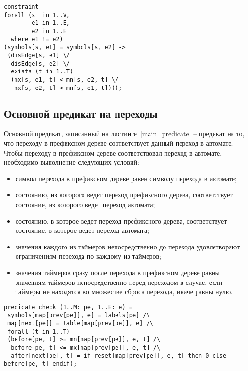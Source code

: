 \documentclass[times,specification,annotation]{itmo-student-thesis}
\begin{document}
\begin{lstlisting}[float=!h,language=Mzn,caption={Ограничение, запрещающее недетерминизм},label={nondeterminism}]
constraint
forall (s  in 1..V,
        e1 in 1..E,
        e2 in 1..E
  where e1 != e2)
(symbols[s, e1] = symbols[s, e2] -> 
 (disEdge[s, e1] \/
  disEdge[s, e2] \/
  exists (t in 1..T) 
  (mx[s, e1, t] < mn[s, e2, t] \/ 
   mx[s, e2, t] < mn[s, e1, t])));
\end{lstlisting}

\subsection{Основной предикат на переходы}

Основной предикат, записанный на листинге~\ref{main_predicate} -- предикат на то, что переходу в префиксном дереве соответствует данный переход в автомате.
Чтобы переходу в префиксном дереве соответствовал переход в автомате, необходимо выполнение следующих условий:

\begin{itemize}
  \item символ перехода в префиксном дереве равен символу перехода в автомате;
  \item состоянию, из которого ведет переход префиксного дерева, соответствует состояние, из которого ведет переход автомата;
  \item состоянию, в которое ведет переход префиксного дерева, соответствует состояние, в которое ведет переход автомата;
  \item значения каждого из таймеров непосредственно до перехода удовлетворяют ограничениям перехода по каждому из таймеров;
  \item значения таймеров сразу после перехода в префиксном дереве равны значениям таймеров непосредственно перед переходом в случае,
    если таймеры не находятся во множестве сброса перехода, иначе равны нулю.
\end{itemize}

\begin{lstlisting}[float=!h,language=Mzn,caption={Основной предикат на переходы},label={main_predicate}]
predicate check (1..M: pe, 1..E: e) =
 symbols[map[prev[pe]], e] = labels[pe] /\
 map[next[pe]] = table[map[prev[pe]], e] /\
 forall (t in 1..T)
 (before[pe, t] >= mn[map[prev[pe]], e, t] /\
  before[pe, t] <= mx[map[prev[pe]], e, t] /\
  after[next[pe], t] = if reset[map[prev[pe]], e, t] then 0 else before[pe, t] endif);
\end{lstlisting}
\end{document}
